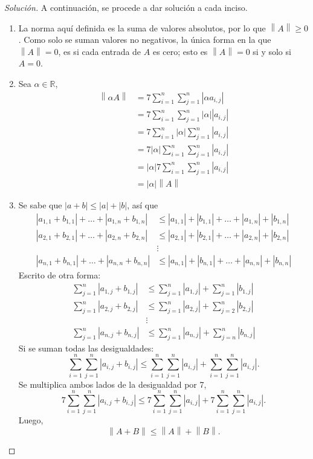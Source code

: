 \documentclass[12pt]{book}
\newcommand{\R}{\mathbb{R}}
\newcommand\norm[1]{\left\lVert#1\right\rVert}
\newcommand\abs[1]{\left\lvert#1\right\rvert}
\newenvironment{solucion}
  {\renewcommand\qedsymbol{$\square$}\begin{proof}[Solución]}
  {\end{proof}}
\begin{document}
\begin{solucion}
A continuación, se procede a dar solución a cada inciso.
    \renewcommand{\labelenumii}{\roman{enumii}.}
    \begin{enumerate}
        \item La norma aquí definida es la suma de valores absolutos, por lo que $\norm{A}\geq0$. Como solo se suman valores no negativos, la única forma en la que $\norm{A}=0$, es si cada entrada de $A$ es cero; esto es $\norm{A}=0$ si y solo si $A=0$.
        \item Sea $\alpha\in\R$,
        \begin{align*}
            \norm{\alpha A}&=7\sum_{i=1}^n\sum_{j=1}^n\abs{\alpha a_{i,j}}\\
            &=7\sum_{i=1}^n\sum_{j=1}^n\abs{\alpha}\abs{a_{i,j}}\\
            &=7\sum_{i=1}^n\abs{\alpha}\sum_{j=1}^n\abs{a_{i,j}}\\
            &=7\abs{\alpha}\sum_{i=1}^n\sum_{j=1}^n\abs{a_{i,j}}\\
            &=\abs{\alpha}7\sum_{i=1}^n\sum_{j=1}^n\abs{a_{i,j}}\\
            &=\abs{\alpha}\norm{A}
        \end{align*}
        \item Se sabe que $\abs{a+b}\leq\abs{a}+\abs{b}$, así que
        \begin{align*}
            \abs{a_{1,1}+b_{1,1}}+\dots+\abs{a_{1,n}+b_{1,n}}&\leq\abs{a_{1,1}}+\abs{b_{1,1}}+\dots+\abs{a_{1,n}}+\abs{b_{1,n}}\\
            \abs{a_{2,1}+b_{2,1}}+\dots+\abs{a_{2,n}+b_{2,n}}&\leq\abs{a_{2,1}}+\abs{b_{2,1}}+\dots+\abs{a_{2,n}}+\abs{b_{2,n}}\\
            &\vdots\\
            \abs{a_{n,1}+b_{n,1}}+\dots+\abs{a_{n,n}+b_{n,n}}&\leq\abs{a_{n,1}}+\abs{b_{n,1}}+\dots+\abs{a_{n,n}}+\abs{b_{n,n}}
        \end{align*}
        Escrito de otra forma:
        \begin{align*}
            \sum_{j=1}^n\abs{a_{1,j}+b_{1,j}}&\leq\sum_{j=1}^n\abs{a_{1,j}}+\sum_{j=1}^n\abs{b_{1,j}}\\
            \sum_{j=1}^n\abs{a_{2,j}+b_{2,j}}&\leq\sum_{j=1}^n\abs{a_{2,j}}+\sum_{j=2}^n\abs{b_{2,j}}\\
            &\vdots\\
            \sum_{j=1}^n\abs{a_{n,j}+b_{n,j}}&\leq\sum_{j=1}^n\abs{a_{n,j}}+\sum_{j=n}^n\abs{b_{n,j}}
        \end{align*}
        Si se suman todas las desigualdades:
        \[\sum_{i=1}^n\sum_{j=1}^n\abs{a_{i,j}+b_{i,j}}\leq\sum_{i=1}^n\sum_{j=1}^n\abs{a_{i,j}}+\sum_{i=1}^n\sum_{j=1}^n\abs{a_{i,j}}.\]
        Se multiplica ambos lados de la desigualdad por 7,
        \[7\sum_{i=1}^n\sum_{j=1}^n\abs{a_{i,j}+b_{i,j}}\leq7\sum_{i=1}^n\sum_{j=1}^n\abs{a_{i,j}}+7\sum_{i=1}^n\sum_{j=1}^n\abs{a_{i,j}}.\]
        Luego,
        \[\norm{A+B}\leq\norm{A}+\norm{B}.\]
    \end{enumerate}
\end{solucion}
\end{document}
